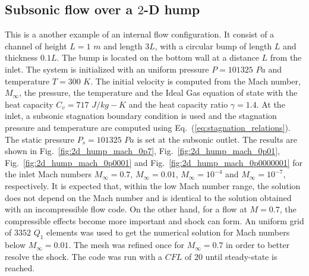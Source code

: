 \documentclass[preprint,10pt]{elsarticle}
\newcommand{\eqt}[1]{Eq.~(\ref{#1})}                     %
\newcommand{\fig}[1]{Fig.~\ref{#1}}                      %
\begin{document}
\subsection{Subsonic flow over a $2$-D hump} \label{sec:hump}
This is a another example of an internal flow configuration. It consist of a channel of height $L=1$ $m$ and length $3L$, with a circular bump of length $L$ and thickness $0.1L$. The bump is located on the bottom wall at a distance $L$ from the inlet. The system is initialized with an uniform pressure $P=101325$ $Pa$ and temperature $T=300$ $K$. The initial velocity is computed from the Mach number, $M_{\infty}$, the pressure, the temperature and the Ideal Gas equation of state with the heat capacity $C_v = 717$ $J/kg-K$ and the heat capacity ratio $\gamma=1.4$. At the inlet, a subsonic stagnation boundary condition is used and the stagnation pressure and temperature are computed using \eqt{eq:stagnation_relations}.
The static pressure $P_s = 101325$ $Pa$ is set at the subsonic outlet. The results are shown in \fig{fig:2d_hump_mach_0p7}, \fig{fig:2d_hump_mach_0p01}, \fig{fig:2d_hump_mach_0p0001} and \fig{fig:2d_hump_mach_0p0000001} for the inlet Mach numbers $M_{\infty}=0.7$, $M_{\infty}=0.01$, $M_{\infty}=10^{-4}$ and $M_{\infty}=10^{-7}$, respectively. It is expected that, within the low Mach number range, the solution does not depend on the Mach number and is identical to the solution obtained with an incompressible flow code. On the other hand, for a flow at $M=0.7$, the compressible effects become more important and shock can form. An uniform grid of $3352$ $Q_1$ elements was used to get the numerical solution for Mach numbers below $M_{\infty}=0.01$. The mesh was refined once for $M_{\infty}=0.7$ in order to better resolve the shock. The code was run with a $CFL$ of $20$ until steady-state is reached.
\end{document}
